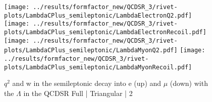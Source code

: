 \begin{figure}[h]
  \centering
  \texttt{[image: ../results/formfactor\_new/QCDSR\_3/rivet-plots/LambdaCPlus\_semileptonic/LambdaElectronQ2.pdf]}
  \texttt{[image: ../results/formfactor\_new/QCDSR\_3/rivet-plots/LambdaCPlus\_semileptonic/LambdaElectronRecoil.pdf]}\\
  \texttt{[image: ../results/formfactor\_new/QCDSR\_3/rivet-plots/LambdaCPlus\_semileptonic/LambdaMyonQ2.pdf]}
  \texttt{[image: ../results/formfactor\_new/QCDSR\_3/rivet-plots/LambdaCPlus\_semileptonic/LambdaMyonRecoil.pdf]}
  \caption{\(q^2\) and w in the semileptonic decay into e (up) and \(\mu\) (down) with the \(\Lambda\) in the QCDSR Full | Triangular | 2}
\end{figure}

